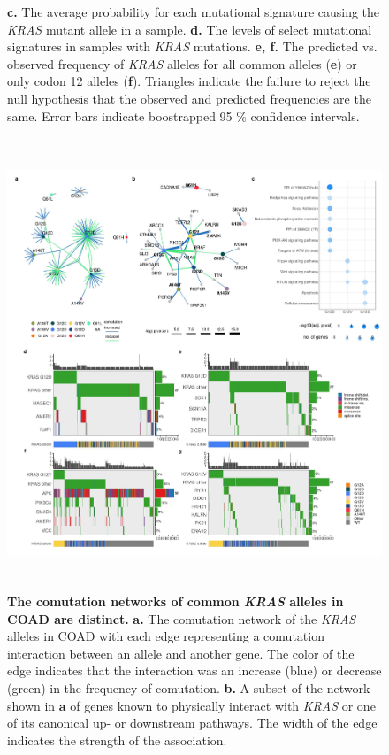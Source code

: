 \documentclass[english, 12pt, letterpaper]{article}
\newcommand{\KRAS}{\emph{KRAS}}
\begin{document}
\begin{figure}[p]
{    \textbf{c.} The average probability for each mutational signature causing the \KRAS{} mutant allele in a sample.
    \textbf{d.} The levels of select mutational signatures in samples with \KRAS{} mutations.
    \textbf{e, f.} The predicted vs. observed frequency of \KRAS{} alleles for all common alleles (\textbf{e}) or only codon 12 alleles (\textbf{f}). Triangles indicate the failure to reject the null hypothesis that the observed and predicted frequencies are the same. Error bars indicate boostrapped 95 \% confidence intervals.
    }
    \label{fig:mutational-signatures-main}
\end{figure}

\begin{figure}[p]
\centering
\includegraphics[height=135mm]{figures/Figure_02.jpeg}
\caption{
    \textbf{The comutation networks of common \KRAS{} alleles in COAD are distinct.}
    \textbf{a.} The comutation network of the \KRAS{} alleles in COAD with each edge representing a comutation interaction between an allele and another gene. The color of the edge indicates that the interaction was an increase (blue) or decrease (green) in the frequency of comutation.
    \textbf{b.} A subset of the network shown in \textbf{a} of genes known to physically interact with \KRAS{} or one of its canonical up- or downstream pathways. The width of the edge indicates the strength of the association.
}
\end{figure}
\end{document}
